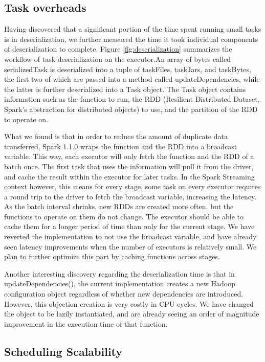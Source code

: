 \subsection{Task overheads}
Having discovered that a significant portion of the time spent running small tasks is in deserialization, we further measured the time it took individual components of deserialization to complete. Figure \ref{fig:deserialization} summarizes the workflow of task deserialization on the executor.An array of bytes called serializedTask is deserialized into a tuple of taskFiles, taskJars, and taskBytes, the first two of which are passed into a method called updateDependencies, while the latter is further deserialized into a Task object. The Task object contains information such as the function to run, the RDD (Resilient Distributed Dataset, Spark's abstraction for distributed objects) to use, and the partition of the RDD to operate on.


What we found is that in order to reduce the amount of duplicate data transferred, Spark 1.1.0 wraps the function and the RDD into a broadcast variable. This way, each executor will only fetch the function and the RDD of a batch once. The first task that uses the information will pull it from the driver, and cache the result within the executor for later tasks. In the Spark Streaming context however, this means for every stage, some task on every executor requires a round trip to the driver to fetch the broadcast variable, increasing the latency. As the batch interval shrinks, new RDDs are created more often, but the functions to operate on them do not change. The executor should be able to cache them for a longer period of time than only for the current stage. We have reverted the implementation to not use the broadcast variable, and have already seen latency improvements when the number of executors is relatively small. We plan to further optimize this part by caching functions across stages.

Another interesting discovery regarding the deserialization time is that in updateDependencies(), the current implementation creates a new Hadoop configuration object regardless of whether new dependencies are introduced. However, this objection creation is very costly in CPU cycles. We have changed the object to be lazily instantiated, and are already seeing an order of magnitude improvement in the execution time of that function.


\subsection{Scheduling Scalability}


